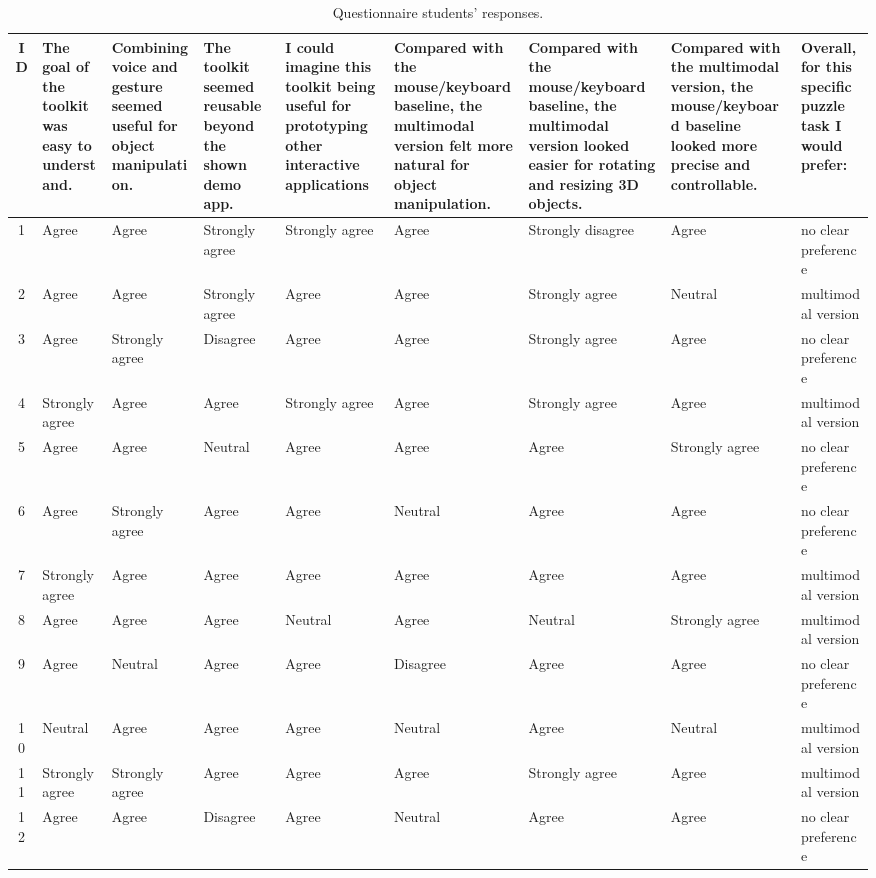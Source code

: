\documentclass[sigconf]{acmart}
\begin{document}
\begin{table}[htbp]
  \caption{Questionnaire students' responses.}
  \centering
  \scriptsize
  \setlength{\tabcolsep}{3pt}
  \renewcommand{\arraystretch}{1.15}
  \begin{tabularx}{\textwidth}{c *{8}{>{\raggedright\arraybackslash}X}}
\toprule
ID & The goal of the toolkit was easy to understand. & Combining voice and gesture seemed useful for object manipulation. & The toolkit seemed reusable beyond the shown demo app. & I could imagine this toolkit being useful for prototyping other interactive applications & Compared with the mouse/keyboard baseline, the multimodal version felt more natural for object manipulation. & Compared with the mouse/keyboard baseline, the multimodal version looked easier for rotating and resizing 3D objects. & Compared with the multimodal version, the mouse/keyboard baseline looked more precise and controllable. & Overall, for this specific puzzle task I would prefer: \\
\midrule
1 & Agree & Agree & Strongly agree & Strongly agree & Agree & Strongly disagree & Agree & no clear preference \\
2 & Agree & Agree & Strongly agree & Agree & Agree & Strongly agree & Neutral & multimodal version \\
3 & Agree & Strongly agree & Disagree & Agree & Agree & Strongly agree & Agree & no clear preference \\
4 & Strongly agree & Agree & Agree & Strongly agree & Agree & Strongly agree & Agree & multimodal version \\
5 & Agree & Agree & Neutral & Agree & Agree & Agree & Strongly agree & no clear preference \\
6 & Agree & Strongly agree & Agree & Agree & Neutral & Agree & Agree & no clear preference \\
7 & Strongly agree & Agree & Agree & Agree & Agree & Agree & Agree & multimodal version \\
8 & Agree & Agree & Agree & Neutral & Agree & Neutral & Strongly agree & multimodal version \\
9 & Agree & Neutral & Agree & Agree & Disagree & Agree & Agree & no clear preference \\
10 & Neutral & Agree & Agree & Agree & Neutral & Agree & Neutral & multimodal version \\
11 & Strongly agree & Strongly agree & Agree & Agree & Agree & Strongly agree & Agree & multimodal version \\
12 & Agree & Agree & Disagree & Agree & Neutral & Agree & Agree & no clear preference \\

\end{tabularx}
\end{table}
\end{document}
